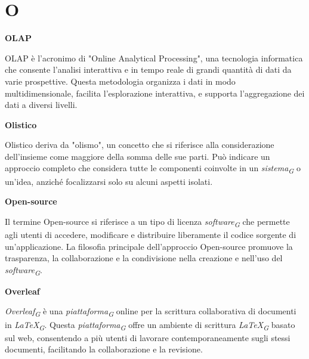 \documentclass{article}
\begin{document}
\pagebreak
\section*{O}
{}

\vspace{0.4cm}

\textbf{OLAP}

\vspace{0.1cm}

OLAP è l'acronimo di "Online Analytical Processing", una tecnologia informatica che consente l'analisi interattiva e in tempo reale di grandi quantità di dati da varie prospettive. Questa metodologia organizza i dati in modo multidimensionale, facilita l'esplorazione interattiva, e supporta l'aggregazione dei dati a diversi livelli.

\vspace{0.4cm}

\textbf{Olistico}

\vspace{0.1cm}

Olistico deriva da "olismo", un concetto che si riferisce alla considerazione dell'insieme come maggiore della somma delle sue parti. Può indicare un approccio completo che considera tutte le componenti coinvolte in un \textit{sistema}\textsubscript{\textit{G}} o un'idea, anziché focalizzarsi solo su alcuni aspetti isolati. 

\vspace{0.4cm}

\textbf{Open-source}

\vspace{0.1cm}

Il termine Open-source si riferisce a un tipo di licenza \textit{software}\textsubscript{\textit{G}} che permette agli utenti di accedere, modificare e distribuire liberamente il codice sorgente di un'applicazione. La filosofia principale dell'approccio Open-source promuove la trasparenza, la collaborazione e la condivisione nella creazione e nell'uso del \textit{software}\textsubscript{\textit{G}}.

\vspace{0.4cm}

\textbf{Overleaf}

\vspace{0.1cm}

\textit{Overleaf}\textsubscript{\textit{G}} è una \textit{piattaforma}\textsubscript{\textit{G}} online per la scrittura collaborativa di documenti in \textit{LaTeX}\textsubscript{\textit{G}}. Questa \textit{piattaforma}\textsubscript{\textit{G}} offre un ambiente di scrittura \textit{LaTeX}\textsubscript{\textit{G}} basato sul web, consentendo a più utenti di lavorare contemporaneamente sugli stessi documenti, facilitando la collaborazione e la revisione.
\end{document}

